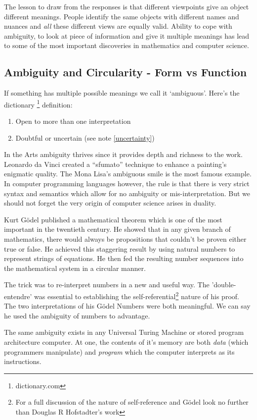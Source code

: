 \documentclass[a4paper,12pt,dvips]{article}
\begin{document}
The lesson to draw from the responses is that different viewpoints give an object different meanings. People identify the same objects with different names and nuances and \emph{all} these different views are equally valid. Ability to cope with ambiguity, to look at piece of information and give it multiple meanings has lead to some of the most important discoveries in mathematics and computer science.       

\subsection{Ambiguity and Circularity - Form vs Function}
If something has multiple possible meanings we call it `ambiguous'. Here's the dictionary \footnote{dictionary.com} definition:
\begin{enumerate}
	\item Open to more than one interpretation
  \item Doubtful or uncertain (see note \ref{uncertainty})
\end{enumerate}

In the Arts ambiguity thrives since it provides depth and richness to the work. Leonardo da Vinci created a ``sfumato'' technique to enhance a painting's enigmatic quality. The Mona Lisa's ambiguous smile is the most famous example. In computer programming languages however, the rule is that there is very strict syntax and semantics which allow for no ambiguity or mis-interpretation. But we should not forget the very origin of computer science arises in duality.

Kurt G\"odel published a mathematical theorem \cite{godel} which is one of the most important in the twentieth century. He showed that in any given branch of mathematics, there would always be propositions that couldn't be proven either true or false. He achieved this staggering result by using natural numbers to represent strings of equations. He then fed the resulting number sequences into the mathematical system in a circular manner. 

The trick was to re-interpret numbers in a new and useful way. The 'double-entendre' was essential to establishing the self-referential\footnote{For a full discussion of the nature of self-reference and G\"odel look no further than Douglas R Hofstadter's work\cite{geb}} nature of his proof.  The two interpretations of his G\"odel Numbers were both meaningful. We can say he used the ambiguity of numbers to advantage.

The same ambiguity exists in any Universal Turing Machine \cite{turing} or stored program architecture computer. At one, the contents of it's memory are both \emph{data} (which programmers manipulate) and \emph{program} which the computer interprets as its instructions. 
\end{document}
